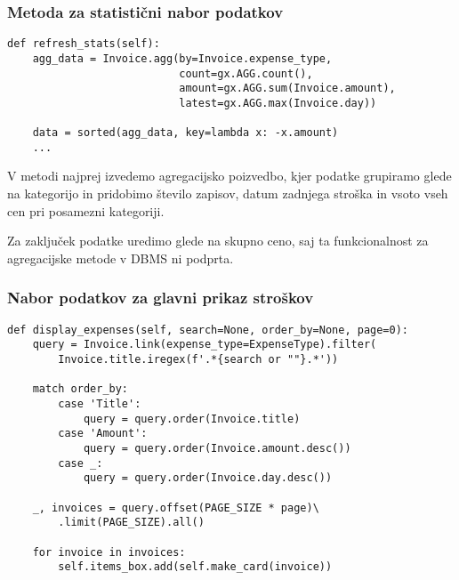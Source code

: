 \documentclass[a4paper,12pt,openright]{book}
\begin{document}
    \subsubsection{Metoda za statistični nabor podatkov}

\begin{verbatim}
def refresh_stats(self):
    agg_data = Invoice.agg(by=Invoice.expense_type,
                           count=gx.AGG.count(), 
                           amount=gx.AGG.sum(Invoice.amount), 
                           latest=gx.AGG.max(Invoice.day))
    
    data = sorted(agg_data, key=lambda x: -x.amount)
    ...
\end{verbatim}

    \noindent
    V metodi najprej izvedemo agregacijsko poizvedbo, kjer podatke grupiramo glede na kategorijo in pridobimo število zapisov, datum zadnjega stroška in vsoto vseh cen pri posamezni kategoriji.

    Za zaključek podatke uredimo glede na skupno ceno, saj ta funkcionalnost za agregacijske metode v DBMS ni podprta.

    \subsubsection{Nabor podatkov za glavni prikaz stroškov}
    
\begin{verbatim}
def display_expenses(self, search=None, order_by=None, page=0):
    query = Invoice.link(expense_type=ExpenseType).filter(
        Invoice.title.iregex(f'.*{search or ""}.*'))

    match order_by:
        case 'Title':
            query = query.order(Invoice.title)
        case 'Amount':
            query = query.order(Invoice.amount.desc())
        case _:
            query = query.order(Invoice.day.desc())
    
    _, invoices = query.offset(PAGE_SIZE * page)\
        .limit(PAGE_SIZE).all()
    
    for invoice in invoices:
        self.items_box.add(self.make_card(invoice))
\end{verbatim}
\end{document}

